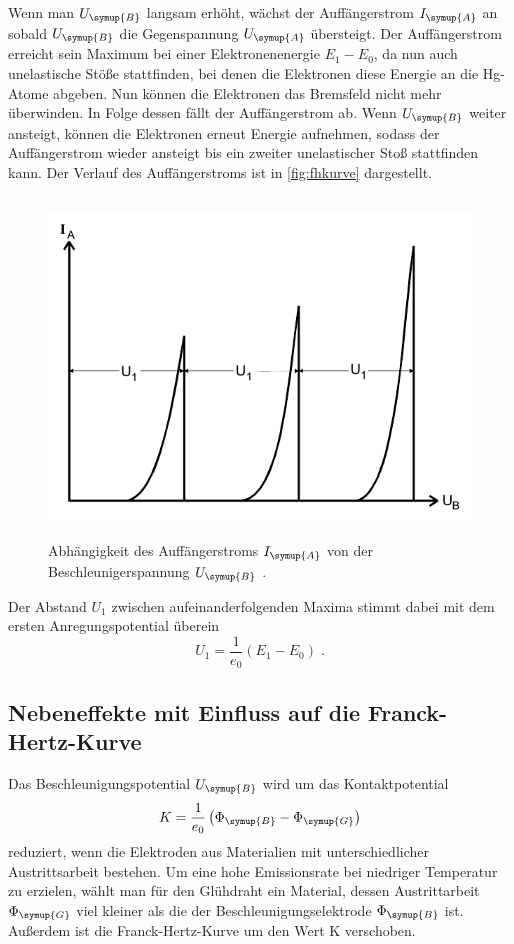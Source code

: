 Wenn man $U_{\symup{B}}$ langsam erhöht, wächst der Auffängerstrom $I_{\symup{A}}$ an sobald $U_{\symup{B}}$ die Gegenspannung $U_{\symup{A}}$ 
übersteigt. Der Auffängerstrom erreicht sein Maximum bei einer Elektronenenergie $E_1 - E_0$, da nun auch unelastische Stöße stattfinden, bei denen
die Elektronen diese Energie an die Hg-Atome abgeben. Nun können die Elektronen das Bremsfeld nicht mehr überwinden. In Folge dessen fällt der 
Auffängerstrom ab. Wenn $U_{\symup{B}}$ weiter ansteigt, können die Elektronen erneut Energie aufnehmen, sodass der Auffängerstrom wieder ansteigt 
bis ein zweiter unelastischer Stoß stattfinden kann. Der Verlauf des Auffängerstroms ist in \autoref{fig:fhkurve} dargestellt. 
\begin{figure}
    \centering
    \includegraphics[height = 9cm]{fhkurve.pdf}
    \caption{Abhängigkeit des Auffängerstroms $I_{\symup{A}}$ von der Beschleunigerspannung $U_{\symup{B}}$ \cite{ap601}.}
    \label{fig:fhkurve}
\end{figure}

Der Abstand $U_1$ zwischen aufeinanderfolgenden Maxima stimmt dabei mit dem ersten Anregungspotential überein
\begin{equation*}
    U_1 = \frac{1}{e_0}\left(E_1 - E_0\right) \; .
\end{equation*}

\subsection{Nebeneffekte mit Einfluss auf die Franck-Hertz-Kurve}
Das Beschleunigungspotential $U_{\symup{B}}$ wird um das Kontaktpotential 
\begin{equation*}
    K = \frac{1}{e_0} \left(\Phi_{\symup{B}}-\Phi_{\symup{G}}\right)
\end{equation*}
reduziert, wenn die Elektroden aus Materialien mit unterschiedlicher Austrittsarbeit bestehen. Um eine hohe Emissionsrate bei niedriger Temperatur zu 
erzielen, wählt man für den Glühdraht ein Material, dessen Austrittarbeit $\Phi_{\symup{G}}$ viel kleiner als die der Beschleunigungselektrode 
$\Phi_{\symup{B}}$ ist.
Außerdem ist die Franck-Hertz-Kurve um den Wert K verschoben.

